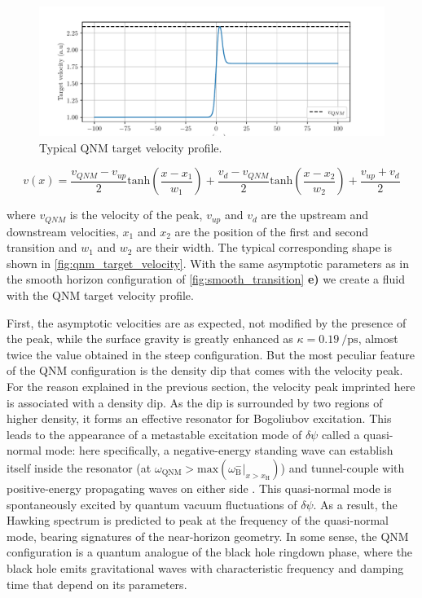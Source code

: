 \begin{figure}
    \centering
    \includegraphics[width=1\textwidth]{chap_custom_st/fig/qnm_target_velocity.pdf}
    \caption{Typical QNM target velocity profile.}
    \label{fig:qnm_target_velocity}
\end{figure}


\begin{equation}
    v(x)= \frac{v_{QNM}-v_{up}}{2}\mathrm{tanh}(\frac{x-x_1}{w_1})+ \frac{v_{d}-v_{QNM}}{2}\mathrm{tanh}(\frac{x-x_2}{w_2})+\frac{v_{up}+v_{d}}{2}
    \label{eq:target_velocity_qnm}
\end{equation}

where $v_{QNM}$ is the velocity of the peak, $v_{up}$ and $v_{d}$ are the upstream and downstream velocities, $x_1$ and $x_2$ are the position of the first and second transition and $w_1$ and $w_2$ are their width.
The typical corresponding shape is shown in \autoref{fig:qnm_target_velocity}.
With the same asymptotic parameters as in the smooth horizon configuration of \autoref{fig:smooth_transition} \textbf{e)} we create a fluid with the QNM target velocity profile.


First, the asymptotic velocities are as expected, not modified by the presence of the peak, while the surface gravity 
is greatly enhanced as $\kappa = \SI{0.19}{\per \pico \second}$, almost twice the value obtained in the steep configuration.
But the most peculiar feature of the QNM configuration is the density dip that comes with the velocity peak. For the reason explained in the previous section,
the velocity peak imprinted here is associated with a density dip. As the dip is surrounded by two regions of higher density, it forms an effective resonator for Bogoliubov excitation.
This leads to the appearance of a metastable excitation mode of $\delta \psi$ called a quasi-normal mode: here specifically, a negative-energy standing wave can establish itself inside the resonator (at $\omega_\mathrm{QNM}>\mathrm{max}(\omega_\mathrm{B}^-|_{x>x_\mathrm{H}})$) and tunnel-couple with positive-energy propagating waves on either side \cite{jacquet_quantum_2023}.
This quasi-normal mode is spontaneously excited by quantum vacuum fluctuations of $\delta \psi$.
As a result, the Hawking spectrum is predicted to peak at the frequency of the quasi-normal mode, bearing signatures of the near-horizon geometry. 
In some sense, the QNM configuration is a quantum analogue of the black hole ringdown phase, where the black hole emits gravitational waves with characteristic frequency and damping time \cite{brito_superradiance_2015} that depend on its parameters. 

